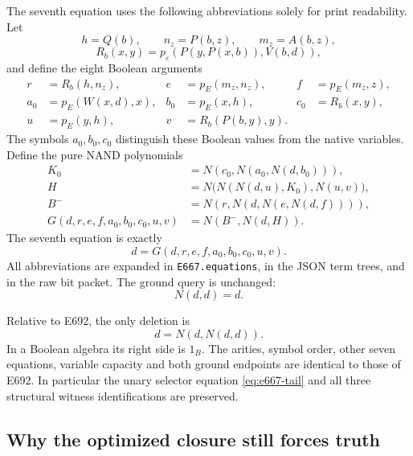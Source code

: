The seventh equation uses the following abbreviations solely for print
readability. Let
\[
 h=Q(b),\qquad n_z=P(b,z),\qquad m_z=A(b,z),
\]
\[
 R_b(x,y)=p_\varepsilon(P(y,P(x,b)),V(b,d)),
\]
and define the eight Boolean arguments
\begin{align*}
 r&=R_b(h,n_z),&e&=p_E(m_z,n_z),&f&=p_E(m_z,z),\\
 a_0&=p_E(W(x,d),x),&b_0&=p_E(x,h),&c_0&=R_b(x,y),\\
 u&=p_E(y,h),&v&=R_b(P(b,y),y).&&
\end{align*}
The symbols $a_0,b_0,c_0$ distinguish these Boolean values from the
native variables. Define the pure NAND polynomials
\begin{align*}
 K_0&=N(c_0,N(a_0,N(d,b_0))),\\
 H&=N\bigl(N(N(d,u),K_0),N(u,v)\bigr),\\
 B^-&=N(r,N(d,N(e,N(d,f)))),\\
 G(d,r,e,f,a_0,b_0,c_0,u,v)&=N(B^-,N(d,H)).
\end{align*}
The seventh equation is exactly
\begin{equation}
                         d=G(d,r,e,f,a_0,b_0,c_0,u,v).
                         \label{eq:e667-closure}
\end{equation}
All abbreviations are expanded in \texttt{E667.equations}, in the JSON
term trees, and in the raw bit packet. The ground query is unchanged:
\[
                             N(d,d)=d.
\]

Relative to E692, the only deletion is
\begin{equation}
                            d=N(d,N(d,d)).
                            \tag{T}\label{eq:e667-deletedtruth}
\end{equation}
In a Boolean algebra its right side is $1_B$. The arities, symbol order,
other seven equations, variable capacity and both ground endpoints are
identical to those of E692. In particular the unary selector equation
\eqref{eq:e667-tail} and all three structural witness identifications
are preserved.

\subsection{Why the optimized closure still forces truth}

